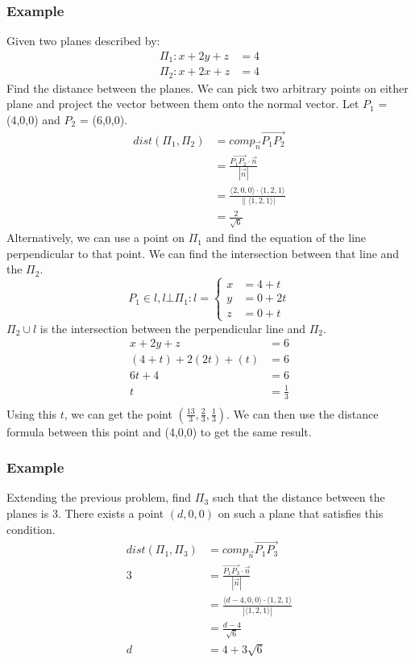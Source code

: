 \documentclass{math}
\begin{document}
\subsubsection*{Example}
Given two planes described by:
\begin{align*}
  \Pi_1: x+2y+z &= 4 \\
  \Pi_2: x+2x+z &= 4
\end{align*}
Find the distance between the planes. We can pick two arbitrary points on either
plane and project the vector between them onto the normal vector. Let \( P_1 \)
= (4,0,0) and \( P_2 \) = (6,0,0).
\begin{align*}
  dist(\Pi_1,\Pi_2) &= comp_{\vec{n}}\overrightarrow{P_1P_2} \\
  &= \frac{\overrightarrow{P_1P_2}\cdot\vec{n}}{|\vec{n}|} \\
  &= \frac{\langle2,0,0\rangle\cdot\langle1,2,1\rangle}
    {\|\langle1,2,1\rangle|} \\
  &= \frac{2}{\sqrt{6}}
\end{align*}
Alternatively, we can use a point on \( \Pi_1 \) and find the equation of the
line perpendicular to that point. We can find the intersection between that
line and the \( \Pi_2 \).
\[ P_1\in l,l\bot\Pi_1: l = \begin{cases}
  x &= 4+t \\
  y &= 0+2t \\
  z &= 0+t
\end{cases} \]
\( \Pi_2\cup l \) is the intersection between the perpendicular line and
\( \Pi_2 \).
\begin{align*}
  x+2y+z &= 6 \\
  (4+t)+2(2t)+(t) &= 6 \\
  6t+4 &= 6 \\
  t &= \frac{1}{3} \\
\end{align*}
Using this \( t \), we can get the point
\( (\frac{13}{3},\frac{2}{3},\frac{1}{3}) \). We can then use the distance
formula between this point and (4,0,0) to get the same result.

\subsubsection*{Example}
Extending the previous problem, find \( \Pi_3 \) such that the distance between
the planes is 3. There exists a point \( (d,0,0) \) on such a plane that
satisfies this condition.
\begin{align*}
  dist(\Pi_1,\Pi_3) &= comp_{\vec{n}}{\overrightarrow{P_1P_3}} \\
  3 &= \frac{\overrightarrow{P_1P_3}\cdot\vec{n}}{|\vec{n}|} \\
  &= \frac{\langle d-4,0,0\rangle\cdot\langle1,2,1\rangle}
    {|\langle1,2,1\rangle|} \\
  &= \frac{d-4}{\sqrt{6}} \\
  d &= 4+3\sqrt{6}
\end{align*}
\end{document}
